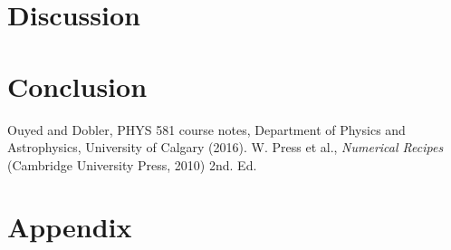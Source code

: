 \documentclass[twocolumn]{article}
\begin{document}

\section{Discussion}


\section{Conclusion}

\begin{thebibliography}{00}
	Ouyed and Dobler, PHYS 581 course notes, Department of Physics and Astrophysics, University of Calgary (2016).
	W. Press et al., \emph{Numerical Recipes} (Cambridge University Press, 2010) 2nd. Ed.
\end{thebibliography}

\section{Appendix}

	
\end{document}
